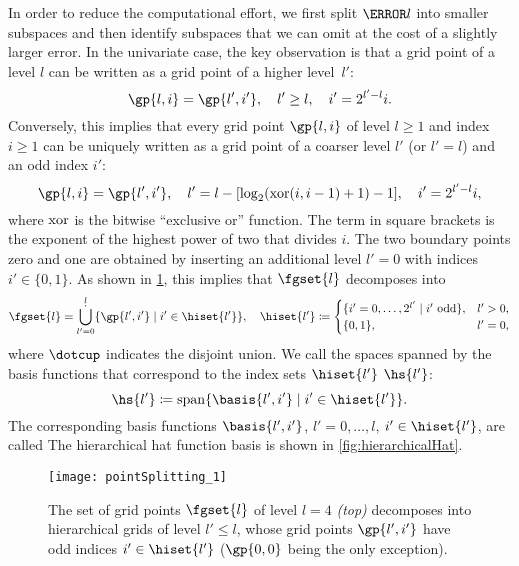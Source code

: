 In order to reduce the computational effort,
we first split $\ns{\*l}$ into smaller subspaces and then identify
subspaces that we can omit at the cost of a slightly larger error.
In the univariate case, the key observation is that a grid point of a
level $l$ can be written as a grid point of a higher level~$l'$:
\begin{equation}
  \label{eq:rewriteGridPoint}
  \gp{l,i} = \gp{l',i'},\quad
  l' \ge l,\quad
  i' = 2^{l'-l} i.
\end{equation}
Conversely, this implies that every grid point $\gp{l,i}$ of level $l \ge 1$
and index $i \ge 1$ can be uniquely written
as a grid point of a coarser level $l'$ (or $l' = l$) and an odd index $i'$:
\begin{equation}
  \gp{l,i} = \gp{l',i'},\quad
  l' = l - \bracket*{\log_2(\xor(i, i-1) + 1) - 1},\quad
  i' = 2^{l'-l} i,
\end{equation}
where $\operatorname{xor}$ is the bitwise ``exclusive or'' function.
The term in square brackets is the exponent of the
highest power of two that divides $i$.
The two boundary points zero and one are obtained by
inserting an additional level $l' = 0$ with indices $i' \in \{0, 1\}$.
As shown in \cref{fig:pointSplittingUniform},
this implies that $\fgset{l}$ decomposes into
\begin{equation}
  \fgset{l}
  = \bigdotcup_{l'=0}^l \{\gp{l',i'} \mid i' \in \hiset{l'}\},\quad
  \hiset{l'} \ceq
  \begin{cases}
    \{i' = 0, \dotsc, 2^{l'} \mid \text{$i'$ odd}\},&l' > 0,\\
    \{0, 1\},&l' = 0,
  \end{cases}
\end{equation}
where $\dotcup$ indicates the disjoint union.
We call the spaces spanned by the basis functions that correspond to the
index sets $\hiset{l'}$  $\hs{l'}$:
\begin{equation}
  \hs{l'}
  \ceq \spn\{\basis{l',i'} \mid i' \in \hiset{l'}\}.
\end{equation}
The corresponding basis functions
$\basis{l',i'}$, $l' = 0, \dotsc, l$, $i' \in \hiset{l'}$,
are called 
The hierarchical hat function basis is shown in \cref{fig:hierarchicalHat}.

\begin{SCfigure}
  \texttt{[image: pointSplitting\_1]}%
  \caption[%
    Decomposition of the set of univariate grid points%
  ]{%
    The set of grid points $\fgset{l}$ of level $l = 4$ \emph{(top)}
    decomposes into hierarchical grids of level $l' \le l$,
    whose grid points $\gp{l',i'}$ have odd indices $i' \in \hiset{l'}$
    ($\gp{0,0}$ being the only exception).%
  }%
  \label{fig:pointSplittingUniform}%
\end{SCfigure}

